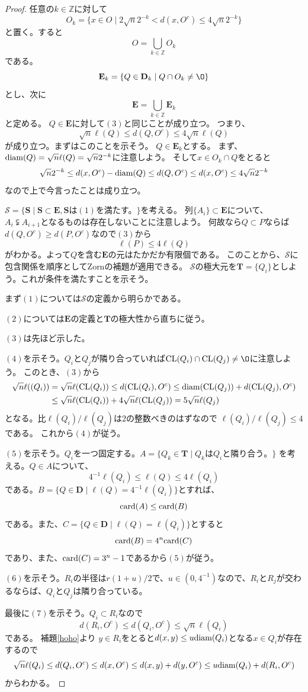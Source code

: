 \documentclass[leqno]{jsarticle}
\newcommand{\zz}{\mathbb{Z}}
\newcommand{\card}{\text{{\rm card}}}
\newcommand{\cl}{\text{{\rm CL}}}
\newcommand{\di}{\text{{\rm diam}}}
\begin{document}
\begin{proof}
任意の$k\in \zz$に対して
\[
O_k=\{x\in O\mid 2\sqrt{n}2^{-k}<d(x, O^c)\le 4\sqrt{n}2^{-k}\}
\]
と置く。すると
\[
O=\bigcup_{k\in \zz}O_k
\]
である。
\[
\mathbf{E}_k=\{Q\in \mathbf{D}_k\mid Q\cap O_k\neq \O\}
\]
とし、次に
\[
\mathbf{E}=\bigcup_{k\in\zz}\mathbf{E}_k
\]
と定める。
$Q\in \mathbf{E}$に対して$(3)$と同じことが成り立つ。
つまり、
\[
\sqrt{n}\ell(Q)\le d(Q, O^c)\le 4\sqrt{n}\ell(Q)
\]
が成り立つ。まずはこのことを示そう。
$Q\in \mathbf{E}_k$とする。
まず、$\di(Q)=\sqrt{n}\ell(Q)=\sqrt{n}2^{-k}$に注意しよう。
そして$x\in O_k\cap Q$をとると
\[
\sqrt{n}2^{-k}\le d(x,O^c)-\di(Q)\le d(Q,O^c)\le d(x,O^c)\le 4\sqrt{n}2^{-k}
\]
なので上で今言ったことは成り立つ。

$\mathcal{S}=\{\mathbf{S}\mid \mathbf{S}\subset \mathbf{E}, \text{$\mathbf{S}$は$(1)$を満たす。}\}$を考える。
列$\{A_i\}\subset \mathbf{E}$について、$A_i\subsetneqq A_{i+1}$となるものは存在しないことに注意しよう。
何故なら$Q\subset P$ならば$d(Q,O^c)\ge d(P,O^c)$なので$(3)$から
\[
\ell(P)\le 4\ell(Q)
\]
がわかる。よって$Q$を含む$\mathbf{E}$の元はたかだか有限個である。
このことから、$\mathcal{S}$に包含関係を順序としてZornの補題が適用できる。
$\mathcal{S}$の極大元を$\mathbf{T}=\{Q_i\}$としよう。これが条件を満たすことを示そう。

まず$(1)$については$\mathcal{S}$の定義から明らかである。

$(2)$については$\mathbf{E}$の定義と$\mathbf{T}$の極大性から直ちに従う。

$(3)$は先ほど示した。

$(4)$を示そう。$Q_i$と$Q_j$が隣り合っていれば$\cl(Q_i)\cap \cl(Q_j)\neq \O$に注意しよう。
このとき、$(3)$から
\begin{align*}
\sqrt{n}\ell((Q_i))&=\sqrt{n}\ell(\cl(Q_i))\le d(\cl(Q_i),O^c)\le \di(\cl(Q_j))+d(\cl(Q_j),O^c)\\
&\le \sqrt{n}\ell(\cl(Q_i))+4\sqrt{n}\ell(\cl(Q_j))=5\sqrt{n}\ell(Q_j)
\end{align*}
となる。比$\ell(Q_i)/\ell(Q_j)$は$2$の整数べきのはずなので
$\ell(Q_i)/\ell(Q_j)\le 4$である。
これから$(4)$が従う。

$(5)$を示そう。$Q_i$を一つ固定する。$A=\{Q_k\in \mathbf{T}\mid Q_kはQ_iと隣り合う。\}$
を考える。$Q\in A$について、
\[
4^{-1}\ell(Q_i)\le \ell(Q)\le 4\ell(Q_i)
\]
である。$B=\{Q\in \mathbf{D}\mid \ell(Q)=4^{-1}\ell(Q_i)\}$とすれば、
\[
\card(A)\le \card(B)
\]
である。また、$C=\{Q\in \mathbf{D}\mid \ell(Q)=\ell(Q_i)\}$とすると
\[
\card(B)=4^n\card(C)
\]
であり、また、$\card(C)=3^n-1$であるから$(5)$が従う。

$(6)$を示そう。$R_i$の半径は$r(1+u)/2$で、$u\in (0,4^{-1})$なので、$R_i$と$R_j$が交わるならば、$Q_i$と$Q_j$は隣り合っている。

最後に$(7)$を示そう。$Q_i\subset R_i$なので
\[
d(R_i,O^c)\le  d(Q_i,O^c)\le \sqrt{n}\ell(Q_i)
\]
である。
補題\ref{hoho}より
$y\in R_i$をとると$d(x,y)\le u\di(Q_i)$となる$x\in Q_i$が存在するので
\[
\sqrt{n}\ell(Q_i)\le d(Q_i,O^c)\le d(x, O^c)\le d(x,y)+d(y,O^c)\le u\di(Q_i)+d(R_i, O^c)
\]
からわかる。
\end{proof}
\end{document}
